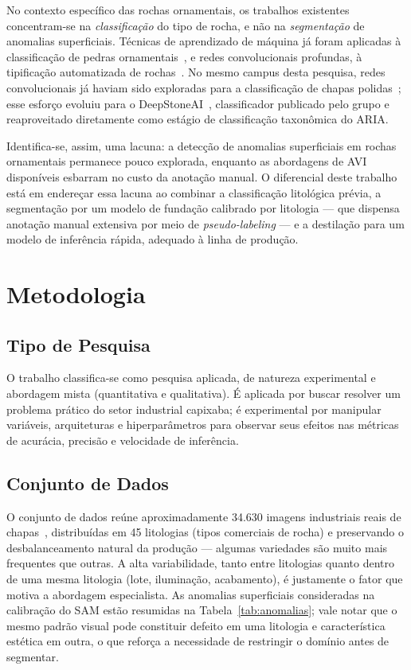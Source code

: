 \documentclass[12pt]{article}
\begin{document}
No contexto específico das rochas ornamentais, os trabalhos existentes concentram-se na \textit{classificação} do tipo de rocha, e não na \textit{segmentação} de anomalias superficiais. Técnicas de aprendizado de máquina já foram aplicadas à classificação de pedras ornamentais~\cite{stone_lopez2010, stone_tereso2020}, e redes convolucionais profundas, à tipificação automatizada de rochas~\cite{rocktyping_baraboshkin2020}. No mesmo campus desta pesquisa, redes convolucionais já haviam sido exploradas para a classificação de chapas polidas~\cite{deepstone_araujo2022}; esse esforço evoluiu para o DeepStoneAI~\cite{deepstoneai_moreira2025}, classificador publicado pelo grupo e reaproveitado diretamente como estágio de classificação taxonômica do ARIA.

Identifica-se, assim, uma lacuna: a detecção de anomalias superficiais em rochas ornamentais permanece pouco explorada, enquanto as abordagens de AVI disponíveis esbarram no custo da anotação manual. O diferencial deste trabalho está em endereçar essa lacuna ao combinar a classificação litológica prévia, a segmentação por um modelo de fundação calibrado por litologia --- que dispensa anotação manual extensiva por meio de \textit{pseudo-labeling} --- e a destilação para um modelo de inferência rápida, adequado à linha de produção.

\section{Metodologia}
\label{sec:metodologia}

\subsection{Tipo de Pesquisa}

O trabalho classifica-se como pesquisa aplicada, de natureza experimental e abordagem mista (quantitativa e qualitativa). É aplicada por buscar resolver um problema prático do setor industrial capixaba; é experimental por manipular variáveis, arquiteturas e hiperparâmetros para observar seus efeitos nas métricas de acurácia, precisão e velocidade de inferência.

\subsection{Conjunto de Dados}

O conjunto de dados reúne aproximadamente 34.630 imagens industriais reais de chapas~\cite{dataset_araujo2023}, distribuídas em 45 litologias (tipos comerciais de rocha) e preservando o desbalanceamento natural da produção --- algumas variedades são muito mais frequentes que outras. A alta variabilidade, tanto entre litologias quanto dentro de uma mesma litologia (lote, iluminação, acabamento), é justamente o fator que motiva a abordagem especialista. As anomalias superficiais consideradas na calibração do SAM estão resumidas na Tabela~\ref{tab:anomalias}; vale notar que o mesmo padrão visual pode constituir defeito em uma litologia e característica estética em outra, o que reforça a necessidade de restringir o domínio antes de segmentar.
\end{document}

